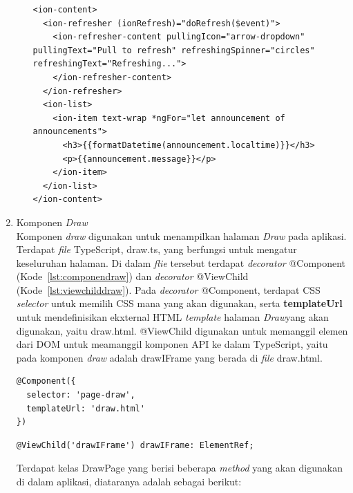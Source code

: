 \begin{enumerate}
\begin{itemize}
\newpage		
		
\begin{lstlisting}[label={lst:contentannouncement}, caption=\textit{Content} pada Halaman \textit{Annoncement}]
<ion-content>
  <ion-refresher (ionRefresh)="doRefresh($event)">
    <ion-refresher-content pullingIcon="arrow-dropdown" pullingText="Pull to refresh" refreshingSpinner="circles" refreshingText="Refreshing...">
    </ion-refresher-content>
  </ion-refresher>
  <ion-list>
    <ion-item text-wrap *ngFor="let announcement of announcements">
      <h3>{{formatDatetime(announcement.localtime)}}</h3>
      <p>{{announcement.message}}</p>
    </ion-item>
  </ion-list>
</ion-content>
\end{lstlisting} 
	\end{itemize}
	
	\item Komponen \textit{Draw} \\
	Komponen \textit{draw} digunakan untuk menampilkan halaman \textit{Draw} pada aplikasi. Terdapat \textit{file} TypeScript, draw.ts, yang berfungsi untuk mengatur keseluruhan halaman. Di dalam \textit{flie} tersebut terdapat \textit{decorator} @Component (Kode~\ref{lst:componendraw}) dan \textit{decorator} @ViewChild (Kode~\ref{lst:viewchilddraw}). Pada \textit{decorator} @Component, terdapat CSS \textit{selector} untuk memilih CSS mana yang akan digunakan, serta \textbf{templateUrl} untuk mendefinisikan ekxternal HTML \textit{template} halaman \textit{Draw}yang akan digunakan, yaitu draw.html. @ViewChild digunakan untuk memanggil elemen dari DOM untuk meamanggil komponen API ke dalam TypeScript, yaitu pada komponen \textit{draw} adalah drawIFrame yang berada di \textit{file} draw.html.
\begin{lstlisting}[label={lst:componendraw}, caption=@Component pada draw.ts]
@Component({
  selector: 'page-draw',
  templateUrl: 'draw.html'
})
\end{lstlisting} 

\begin{lstlisting}[label={lst:viewchilddraw}, caption=@ViewChild pada draw.ts]
@ViewChild('drawIFrame') drawIFrame: ElementRef;
\end{lstlisting} 

	Terdapat kelas DrawPage yang berisi beberapa \textit{method} yang akan digunakan di dalam aplikasi, diataranya adalah sebagai berikut:
	

\end{enumerate}
